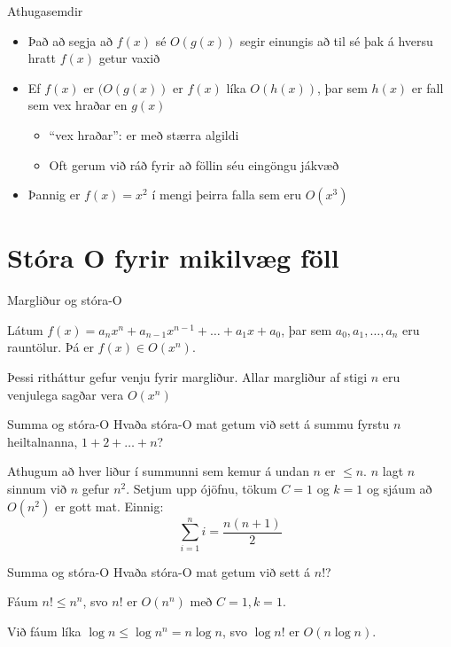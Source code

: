 \documentclass{beamer}
\begin{document}
\begin{frame}{Athugasemdir}
\begin{itemize}
 \item Það að segja að $f(x)$ sé $O(g(x))$ segir einungis að til sé þak á hversu hratt $f(x)$ getur vaxið
 \item Ef $f(x)$ er $(O(g(x))$ er $f(x)$ líka $O(h(x))$, þar sem $h(x)$ er fall sem vex hraðar en $g(x)$
 \begin{itemize}
  \item ``vex hraðar'': er með stærra algildi
  \item Oft gerum við ráð fyrir að föllin séu eingöngu jákvæð
 \end{itemize}
 \item Þannig er $f(x) = x^2$ í mengi þeirra falla sem eru $O(x^3)$
\end{itemize}
\end{frame}

\section{Stóra O fyrir mikilvæg föll}

\begin{frame}{Margliður og stóra-O}
\begin{tcolorbox}[title=Margliður og stóra O]
Látum $f(x) = a_n x^n + a_{n-1}x^{n-1} + \ldots + a_1x + a_0$, þar sem $a_0, a_1, \ldots, a_n$ eru rauntölur. Þá er $f(x) \in O(x^n)$.
\end{tcolorbox}

Þessi ritháttur gefur venju fyrir margliður. Allar margliður af stigi $n$ eru venjulega sagðar vera $O(x^n)$
\end{frame}

\begin{frame}{Summa og stóra-O}
Hvaða stóra-O mat getum við sett á summu fyrstu $n$ heiltalnanna, $1 + 2 + \ldots + n$? \pause

Athugum að hver liður í summunni sem kemur á undan $n$ er $\leq n$. $n$ lagt $n$ sinnum við $n$ gefur $n^2$. Setjum upp ójöfnu, tökum $C = 1$ og $k = 1$ og sjáum að $O(n^2)$ er gott mat.
\pause
Einnig:
\[
 \sum_{i=1}^n i = \frac{n(n+1)}{2}
\]

\end{frame}

\begin{frame}{Summa og stóra-O}
Hvaða stóra-O mat getum við sett á $n!$? \pause

Fáum $n! \leq n^n$, svo $n!$ er $O(n^n)$ með $C=1, k=1$. 

Við fáum líka $\log n \leq \log n^n = n \log n$, svo $\log n!$ er $O(n \log n)$. 
\end{frame}
\end{document}
